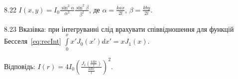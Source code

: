 \begin{Solution}{8.{22}}
	$I(x,y) = I_0\frac{\sin^2\alpha}{\alpha^2}\frac{\sin^2\beta}{\beta^2}$, де $\alpha =
	\frac{kax}{2l}$, $\beta=\frac{kby}{2l}$.
\end{Solution}
\begin{Solution}{8.{23}}
	Вказівка: при інтегруванні слід врахувати співвідношення для функцій Бесселя~\eqref{eq:recInt}
	$\int\limits_0^x x'J_0(x')dx' = xJ_1(x)$.

	Відповідь: $I(r) = 4I_0\left( \frac{J_1\left( \frac{kRr}{l}\right) }{\frac{kRr}{l}}\right)^2$.
\end{Solution}
